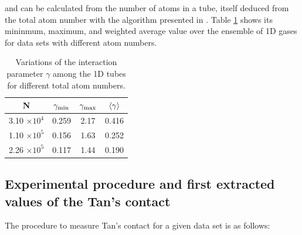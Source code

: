 \noindent and can be calculated from the number of atoms in a tube, itself deduced from the total atom number with the algorithm presented in . Table \ref{tab:gamma_vs_N} shows its mininmum, maximum, and weighted average value over the ensemble of 1D gases for data sets with different atom numbers.


\begin{table}[h!]
\centering
{
    \begin{tabular}{c|c|c|c}
        {\color{MainColor} N} &  {\color{MainColor}$\gamma_{\rm{min}}$} & {\color{MainColor}$\gamma_{\rm{max}}$} & {\color{MainColor}$\left\langle\gamma\right\rangle$}  \\
        \hline
        3.10 $\times 10^4$  & 0.259 & 2.17 & 0.416 \\
        1.10 $\times 10^5$ & 0.156 & 1.63 & 0.252 \\
        2.26 $\times 10^5$ & 0.117 & 1.44 & 0.190 \\
    \end{tabular}}
\caption{Variations of the interaction parameter $\gamma$ among the 1D tubes for different total atom numbers.}
\label{tab:gamma_vs_N}
\end{table}

\subsection{Experimental procedure and first extracted values of the Tan's contact}

The procedure to measure Tan's contact for a given data set is as follows:

